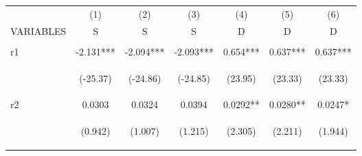 \documentclass[]{article}
\begin{document}
\begin{center}
\begin{tabular}{lcccccc} \hline
 & (1) & (2) & (3) & (4) & (5) & (6) \\
VARIABLES & S & S & S & D & D & D \\ \hline
\vspace{4pt} & \begin{footnotesize}\end{footnotesize} & \begin{footnotesize}\end{footnotesize} & \begin{footnotesize}\end{footnotesize} & \begin{footnotesize}\end{footnotesize} & \begin{footnotesize}\end{footnotesize} & \begin{footnotesize}\end{footnotesize} \\
r1 & -2.131*** & -2.094*** & -2.093*** & 0.654*** & 0.637*** & 0.637*** \\
\vspace{4pt} & \begin{footnotesize}(-25.37)\end{footnotesize} & \begin{footnotesize}(-24.86)\end{footnotesize} & \begin{footnotesize}(-24.85)\end{footnotesize} & \begin{footnotesize}(23.95)\end{footnotesize} & \begin{footnotesize}(23.33)\end{footnotesize} & \begin{footnotesize}(23.33)\end{footnotesize} \\
r2 & 0.0303 & 0.0324 & 0.0394 & 0.0292** & 0.0280** & 0.0247* \\
\vspace{4pt} & \begin{footnotesize}(0.942)\end{footnotesize} & \begin{footnotesize}(1.007)\end{footnotesize} & \begin{footnotesize}(1.215)\end{footnotesize} & \begin{footnotesize}(2.305)\end{footnotesize} & \begin{footnotesize}(2.211)\end{footnotesize} & \begin{footnotesize}(1.944)\end{footnotesize} \\

\end{tabular}
\end{center}
\end{document}
